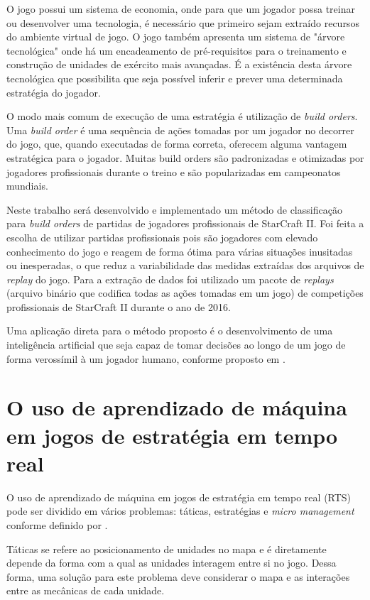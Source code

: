 O jogo possui um sistema de economia, onde para que um jogador possa treinar ou desenvolver uma tecnologia, é necessário que primeiro sejam extraído recursos do ambiente virtual de jogo. O jogo também apresenta um sistema de "árvore tecnológica" onde há um encadeamento de pré-requisitos para o treinamento e construção de unidades de exército mais avançadas. É a existência desta árvore tecnológica que possibilita que seja possível inferir e prever uma determinada estratégia do jogador. 

O modo mais comum de execução de uma estratégia é utilização de \textit{build orders}. Uma \textit{build order} é uma sequência de ações tomadas por um jogador no decorrer do jogo, que, quando executadas de forma correta, oferecem alguma vantagem estratégica para o jogador. Muitas build orders são padronizadas e otimizadas por jogadores profissionais durante o treino e são popularizadas em campeonatos mundiais.

Neste trabalho será desenvolvido e implementado um método de classificação para \textit{build orders} de partidas de jogadores profissionais de StarCraft II. Foi feita a escolha de utilizar partidas profissionais pois são jogadores com elevado conhecimento do jogo e reagem de forma ótima para várias situações inusitadas ou inesperadas, o que reduz a variabilidade das medidas extraídas dos arquivos de \textit{replay} do jogo. Para a extração de dados foi utilizado um pacote de \textit{replays} (arquivo binário que codifica todas as ações tomadas em um jogo) de competições profissionais de StarCraft II durante o ano de 2016.

Uma aplicação direta para o método proposto é o desenvolvimento de uma inteligência artificial que seja capaz de tomar decisões ao longo de um jogo de forma verossímil à um jogador humano, conforme proposto em \cite{synnaeve2011bayesian1}.

		\section{O uso de aprendizado de máquina em jogos de estratégia em tempo real}
O uso de aprendizado de máquina em jogos de estratégia em tempo real (RTS) pode ser dividido em vários problemas: táticas, estratégias e \textit{micro management} conforme definido por \cite{synnaeve2011bayesian2}.

Táticas se refere ao posicionamento de unidades no mapa e é diretamente depende da forma com a qual as unidades interagem entre si no jogo. Dessa forma, uma solução para este problema deve considerar o mapa e as interações entre as mecânicas de cada unidade.

